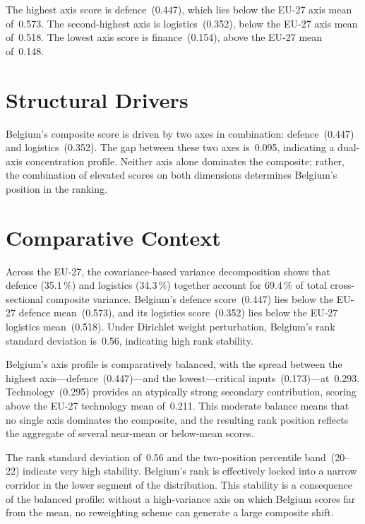 \documentclass[12pt,a4paper]{article}
\begin{document}
The highest axis score is defence~(0.447), which lies below the EU-27 axis mean of~0.573.  The second-highest axis is logistics~(0.352), below the EU-27 axis mean of~0.518.  The lowest axis score is finance~(0.154), above the EU-27 mean of~0.148.


\section{Structural Drivers}
\label{sec:drivers}

\begin{sloppypar}
Belgium's composite score is driven by two axes in combination: defence~(0.447) and logistics~(0.352).  The gap between these two axes is~0.095, indicating a dual-axis concentration profile.  Neither axis alone dominates the composite; rather, the combination of elevated scores on both dimensions determines Belgium's position in the ranking.
\end{sloppypar}


\section{Comparative Context}
\label{sec:comparative}

Across the EU-27, the covariance-based variance decomposition shows that defence (35.1\,\%) and logistics (34.3\,\%) together account for 69.4\,\% of total cross-sectional composite variance.  Belgium's defence score~(0.447) lies below the EU-27 defence mean~(0.573), and its logistics score~(0.352) lies below the EU-27 logistics mean~(0.518).  Under Dirichlet weight perturbation, Belgium's rank standard deviation is~0.56, indicating high rank stability.



Belgium's axis profile is comparatively balanced, with the spread between the highest axis---defence~(0.447)---and the lowest---critical inputs~(0.173)---at~0.293.  Technology~(0.295) provides an atypically strong secondary contribution, scoring above the EU-27 technology mean of~0.211.  This moderate balance means that no single axis dominates the composite, and the resulting rank position reflects the aggregate of several near-mean or below-mean scores.

The rank standard deviation of~0.56 and the two-position percentile band~(20--22) indicate very high stability.  Belgium's rank is effectively locked into a narrow corridor in the lower segment of the distribution.  This stability is a consequence of the balanced profile: without a high-variance axis on which Belgium scores far from the mean, no reweighting scheme can generate a large composite shift.
\end{document}
